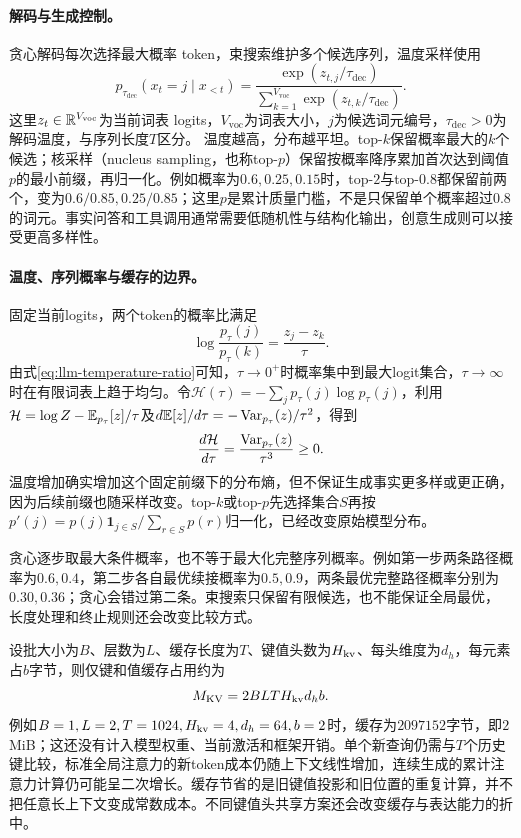 \paragraph{解码与生成控制。}
贪心解码每次选择最大概率 token，束搜索维护多个候选序列，温度采样使用
\begin{equation}
 p_{\tau_{\mathrm{dec}}}(x_t=j\mid x_{<t})
 =\frac{\exp(z_{t,j}/\tau_{\mathrm{dec}})}{\sum_{k=1}^{V_{\mathrm{voc}}}\exp(z_{t,k}/\tau_{\mathrm{dec}})}.
\end{equation}
这里$z_t\in\mathbb{R}^{V_{\mathrm{voc}}}$为当前词表 logits，$V_{\mathrm{voc}}$为词表大小，$j$为候选词元编号，$\tau_{\mathrm{dec}}>0$为解码温度，与序列长度$T$区分。
温度越高，分布越平坦。top-$k$保留概率最大的$k$个候选；核采样（nucleus sampling，也称top-$p$）保留按概率降序累加首次达到阈值$p$的最小前缀，再归一化。例如概率为$0.6,0.25,0.15$时，top-$2$与top-$0.8$都保留前两个，变为$0.6/0.85,0.25/0.85$；这里$p$是累计质量门槛，不是只保留单个概率超过$0.8$的词元。事实问答和工具调用通常需要低随机性与结构化输出，创意生成则可以接受更高多样性。

\paragraph{温度、序列概率与缓存的边界。}
固定当前logits，两个token的概率比满足
\begin{equation}
 \log\frac{p_\tau(j)}{p_\tau(k)}=\frac{z_j-z_k}{\tau}.\label{eq:llm-temperature-ratio}
\end{equation}
由式\eqref{eq:llm-temperature-ratio}可知，$\tau\to0^+$时概率集中到最大logit集合，$\tau\to\infty$时在有限词表上趋于均匀。令$\mathcal H(\tau)=-\sum_jp_\tau(j)\log p_\tau(j)$，利用$\mathcal H=\log Z-\mathbb{E}_{p_\tau}[z]/\tau$及$d\mathbb{E}[z]/d\tau=-\operatorname{Var}_{p_\tau}(z)/\tau^2$，得到
\begin{equation}
 \frac{d\mathcal H}{d\tau}=\frac{\operatorname{Var}_{p_\tau}(z)}{\tau^3}\geq0.
\end{equation}
温度增加确实增加这个固定前缀下的分布熵，但不保证生成事实更多样或更正确，因为后续前缀也随采样改变。top-$k$或top-$p$先选择集合$S$再按$p'(j)=p(j)\mathbf1_{j\in S}/\sum_{r\in S}p(r)$归一化，已经改变原始模型分布。

贪心逐步取最大条件概率，也不等于最大化完整序列概率。例如第一步两条路径概率为$0.6,0.4$，第二步各自最优续接概率为$0.5,0.9$，两条最优完整路径概率分别为$0.30,0.36$；贪心会错过第二条。束搜索只保留有限候选，也不能保证全局最优，长度处理和终止规则还会改变比较方式。

设批大小为$B$、层数为$L$、缓存长度为$T$、键值头数为$H_{\rm kv}$、每头维度为$d_h$，每元素占$b$字节，则仅键和值缓存占用约为
\begin{equation}
 M_{\rm KV}=2BLTH_{\rm kv}d_hb.
\end{equation}
例如$B=1,L=2,T=1024,H_{\rm kv}=4,d_h=64,b=2$时，缓存为$2097152$字节，即$2$ MiB；这还没有计入模型权重、当前激活和框架开销。单个新查询仍需与$T$个历史键比较，标准全局注意力的新token成本仍随上下文线性增加，连续生成的累计注意力计算仍可能呈二次增长。缓存节省的是旧键值投影和旧位置的重复计算，并不把任意长上下文变成常数成本。不同键值头共享方案还会改变缓存与表达能力的折中。

